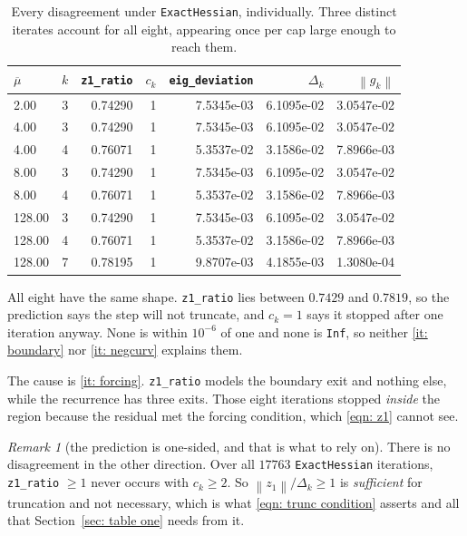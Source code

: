 \documentclass[11pt,a4paper]{article}
\providecommand{\norm}[1]{\left \lVert #1 \right \rVert}
\theoremstyle{remark}
\newtheorem{remark}{Remark}
\begin{document}
\begin{table}[H]
  \centering\small
  \caption{Every disagreement under \texttt{ExactHessian}, individually. Three
    distinct iterates account for all eight, appearing once per cap large enough
    to reach them.}
  \label{tab: four}
  \begin{tabular}{lrrrrrr}
    \toprule
    $\overline{\mu}$ & $k$ & \texttt{z1\_ratio} & $c_k$
      & \texttt{eig\_deviation} & $\Delta_k$ & $\norm{g_k}$ \\
    \midrule
    2.00 & 3 & 0.74290 & 1 & 7.5345e-03 & 6.1095e-02 & 3.0547e-02 \\
    4.00 & 3 & 0.74290 & 1 & 7.5345e-03 & 6.1095e-02 & 3.0547e-02 \\
    4.00 & 4 & 0.76071 & 1 & 5.3537e-02 & 3.1586e-02 & 7.8966e-03 \\
    8.00 & 3 & 0.74290 & 1 & 7.5345e-03 & 6.1095e-02 & 3.0547e-02 \\
    8.00 & 4 & 0.76071 & 1 & 5.3537e-02 & 3.1586e-02 & 7.8966e-03 \\
    128.00 & 3 & 0.74290 & 1 & 7.5345e-03 & 6.1095e-02 & 3.0547e-02 \\
    128.00 & 4 & 0.76071 & 1 & 5.3537e-02 & 3.1586e-02 & 7.8966e-03 \\
    128.00 & 7 & 0.78195 & 1 & 9.8707e-03 & 4.1855e-03 & 1.3080e-04 \\
    \bottomrule
  \end{tabular}
\end{table}

All eight have the same shape. \texttt{z1\_ratio} lies between $0.7429$ and
$0.7819$, so the prediction says the step will not truncate, and $c_k = 1$ says
it stopped after one iteration anyway. None is within $10^{-6}$ of one and none
is \texttt{Inf}, so neither \ref{it: boundary} nor \ref{it: negcurv} explains
them.

The cause is \ref{it: forcing}. \texttt{z1\_ratio} models the boundary exit and
nothing else, while the recurrence has three exits. Those eight iterations
stopped \emph{inside} the region because the residual met the forcing condition,
which \eqref{eqn: z1} cannot see.

\begin{remark}[the prediction is one-sided, and that is what to rely on]
\label{rem: onesided}
  There is no disagreement in the other direction. Over all $17763$
  \texttt{ExactHessian} iterations, \texttt{z1\_ratio} $\geq 1$ never occurs with
  $c_k \geq 2$. So $\norm{z_1}/\Delta_k \geq 1$ is \emph{sufficient} for
  truncation and not necessary, which is what \eqref{eqn: trunc condition}
  asserts and all that Section~\ref{sec: table one} needs from it.
\end{remark}
\end{document}
